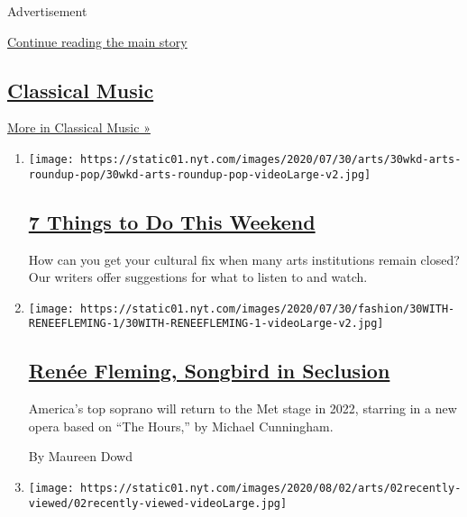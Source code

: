 Advertisement

\protect\hyperlink{after-mid1}{Continue reading the main story}

\hypertarget{classical-music}{%
\subsection{\texorpdfstring{\href{/spotlight/classical-music-reviews}{Classical
Music}}{Classical Music}}\label{classical-music}}

\href{/spotlight/classical-music-reviews}{More in Classical Music »}

\begin{enumerate}
\def\labelenumi{\arabic{enumi}.}
\item
  \texttt{[image: https://static01.nyt.com/images/2020/07/30/arts/30wkd-arts-roundup-pop/30wkd-arts-roundup-pop-videoLarge-v2.jpg]}

  \hypertarget{7-things-to-do-this-weekend}{%
  \subsection{\texorpdfstring{\href{/2020/07/30/arts/things-to-do-weekend-coronavirus.html}{7
  Things to Do This
  Weekend}}{7 Things to Do This Weekend}}\label{7-things-to-do-this-weekend}}

  How can you get your cultural fix when many arts institutions remain
  closed? Our writers offer suggestions for what to listen to and watch.
\item
  \texttt{[image: https://static01.nyt.com/images/2020/07/30/fashion/30WITH-RENEEFLEMING-1/30WITH-RENEEFLEMING-1-videoLarge-v2.jpg]}

  \hypertarget{renuxe9e-fleming-songbird-in-seclusion}{%
  \subsection{\texorpdfstring{\href{/2020/07/30/style/maureen-dowd-renee-fleming.html}{Renée
  Fleming, Songbird in
  Seclusion}}{Renée Fleming, Songbird in Seclusion}}\label{renuxe9e-fleming-songbird-in-seclusion}}

  America's top soprano will return to the Met stage in 2022, starring
  in a new opera based on ``The Hours,'' by Michael Cunningham.

  By Maureen Dowd
\item
  \texttt{[image: https://static01.nyt.com/images/2020/08/02/arts/02recently-viewed/02recently-viewed-videoLarge.jpg]}


\end{enumerate}
